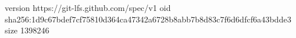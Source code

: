 version https://git-lfs.github.com/spec/v1
oid sha256:1d9c67bdef7cf75810d364ca47342a6728b8abb7b8d83c7f6d6dfcf6a43bdde3
size 1398246
